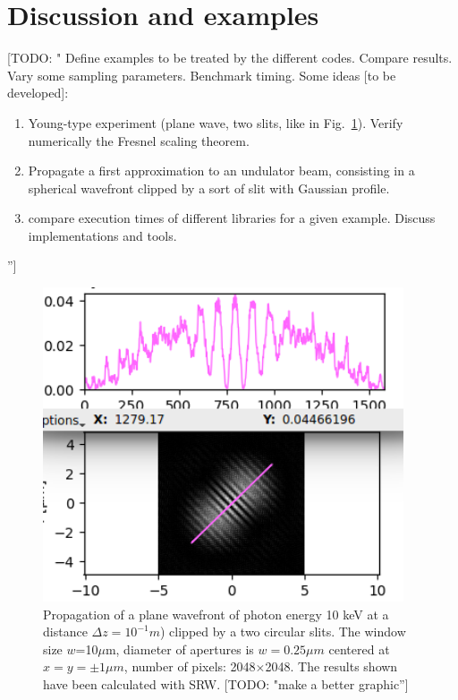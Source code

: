 \documentclass{iucr}              %
\newcommand{\todo}[1]{{\color{red}[TODO: "#1'']}}
\begin{document}
\section{Discussion and examples}

\todo{
Define examples to be treated by the different codes. Compare results. Vary some sampling parameters. Benchmark timing. Some ideas [to be developed]: 

\begin{enumerate}
 \item Young-type experiment (plane wave, two slits, like in Fig.~\ref{fig: srw two slits}). Verify numerically the Fresnel scaling theorem.
 \item Propagate a first approximation to an undulator beam, consisting in a spherical wavefront clipped by a sort of slit with Gaussian profile.  
\item compare execution times of different libraries for a given example. Discuss implementations and tools. 
\end{enumerate}
}

\begin{figure}
\label{fig: srw two slits}
\caption{Propagation of a plane wavefront of photon energy 10 keV at a distance $\Delta z = 10^{-1}m$) clipped by a two circular slits. The window size $w$=10$\mu$m, diameter of apertures is $w=0.25\mu m$ centered at $x=y=\pm 1 \mu m$, number of pixels: 2048$\times$2048. The results shown have been calculated with SRW. \todo{make a better graphic}
}
\includegraphics[width=0.95\textwidth]{srw_two_slits.png}
\end{figure}
\end{document}
